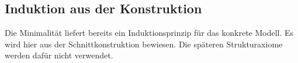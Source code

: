 \noindent\begin{minipage}{\linewidth}
\end{minipage}\par
\begin{tabproofwide}
\end{tabproofwide}

\subsection{Induktion aus der Konstruktion}

Die Minimalität liefert bereits ein Induktionsprinzip für das konkrete
Modell. Es wird hier aus der Schnittkonstruktion bewiesen. Die späteren
Strukturaxiome werden dafür nicht verwendet.

